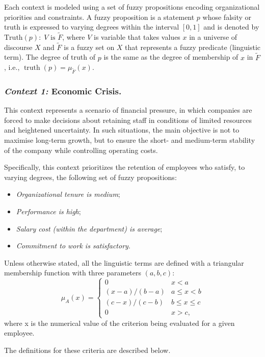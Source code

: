 \documentclass[runningheads]{llncs}
\DeclareMathOperator{\Truth}{truth}
\begin{document}
Each context is modeled using a set of fuzzy propositions encoding organizational priorities and constraints. A fuzzy proposition is a statement $p$ whose falsity or truth is expressed to varying degrees within the interval $[0, 1]$ and is denoted by $\text{Truth}(p):\;V \text{ is } \tilde{F}$, where $V$ is variable that takes values $x$ in a universe of discourse $X$ and $\tilde F$ is a fuzzy set on $X$ that represents a fuzzy predicate (linguistic term). The degree of truth of $p$ is the same as the degree of membership of $x$ in $\tilde F$,  i.e., $\Truth(p)=\mu_{\tilde F}(x)$.
\subsubsection*{\textit{Context 1: }Economic Crisis.}
\label{app:economic_crisis}
This context represents a scenario of financial pressure, in which companies are forced to make decisions about retaining staff in conditions of limited resources and heightened uncertainty. In such situations, the main objective is not to maximise long-term growth, but to ensure the short- and medium-term stability of the company while controlling operating costs.

Specifically, this context prioritizes the retention of employees who satisfy, to varying degrees, the following set of fuzzy propositions:
\begin{itemize}
    \item \textit{Organizational tenure is medium};
    \item \textit{Performance is high}; 
    \item \textit{Salary cost (within the department) is average};
    \item \textit{Commitment to work is satisfactory}.
\end{itemize}

Unless otherwise stated, all the linguistic terms are defined with a triangular membership function with three parameters $(a,b,c)$:
\[
\mu_A(x) = \begin{cases} 
      0 & x < a \\
      (x-a)/(b-a) & a \leq x < b\\
      (c-x)/(c-b) & b \leq x \leq c \\
      0 & x > c, 
   \end{cases}
\]
where x is the numerical value of the criterion being evaluated for a given employee.   

The definitions for these criteria are described below.
\end{document}
